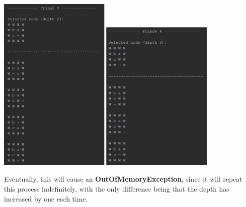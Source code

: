 \documentclass{article}
\begin{document}
	\begin{multicols}{2}[\columnsep=2cm]
		\includegraphics[width=0.4\textwidth,keepaspectratio]{DFS-1-3.png}
		\columnbreak
		\includegraphics[width=0.4\textwidth,keepaspectratio]{DFS-1-4.png}
	\end{multicols}

	\newpage
	Eventually, this will cause an \textbf{OutOfMemoryException}, since it will repeat this process indefinitely, with the only difference being that the depth has increased by one each time.
	
\end{document}
